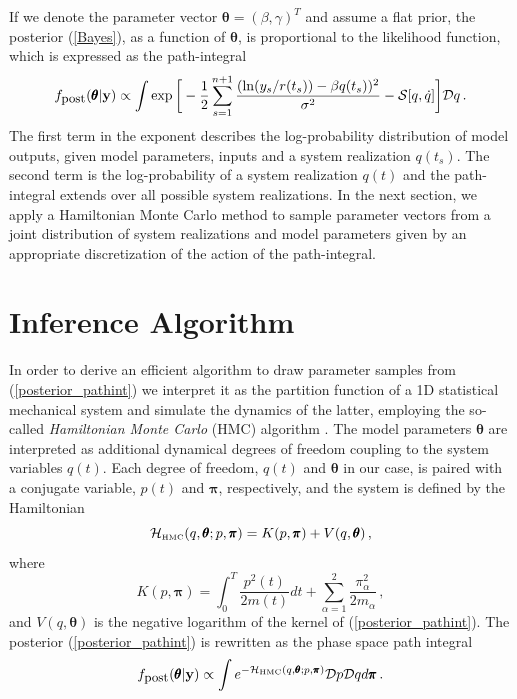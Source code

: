 \documentclass[12pt,a4paper,final]{iopart}
\newcommand{\bt}{\pmb\theta}
\newcommand{\vc}[1]{{\bf #1 }}
\begin{document}
If we denote the parameter vector $\bt=(\beta,\gamma)^T$ and assume a flat prior, the posterior (\ref{Bayes}), as a function of $\bt$, is proportional to the likelihood function, which is expressed as the path-integral
\begin{equation}\label{posterior_pathint}
  f_{\mbox{\small post}}(\bt | \vc y)
  \propto
  \int
  \exp\bigg[
    -\frac{1}{2}
    \sum_{s=1}^{n+1}
    \frac
    {(\ln(y_s/r(t_s))-{\beta q(t_s)})^2}
    {\sigma^2} -{{\mathcal S}}[{q},\dot q]
  \bigg]
  {\mathcal Dq}
  \,.
\end{equation}
The first term in the exponent describes the log-probability distribution of model outputs, given model parameters, inputs and a system realization $q(t_s)$. The second term is the log-probability of a system realization $q(t)$ and the path-integral extends over all possible system realizations. In the next section, we apply a Hamiltonian Monte Carlo method to sample parameter vectors from a joint distribution of system realizations and model parameters given by an appropriate discretization of the action of the path-integral.



\section{Inference Algorithm}

In order to derive an efficient algorithm to draw parameter samples from (\ref{posterior_pathint}) we interpret it as the partition function of a 1D statistical mechanical system and simulate the dynamics of the latter, employing the so-called {\em Hamiltonian Monte Carlo} (HMC) algorithm \cite{duane_1987}.
The model parameters $\bt$ are interpreted as additional dynamical degrees of freedom coupling to the system variables $q(t)$.
Each degree of freedom, $q(t)$ and $\bt$ in our case, is paired with a conjugate variable, $p(t)$ and ${\pmb\pi}$, respectively, and the system is defined by the  Hamiltonian
\begin{equation}\label{Hamiltonian}
    \mathcal{H}_{\mbox{\tiny HMC}}(q,\bt; p,{\pmb\pi})
    =
    K( p,{\pmb\pi}) + V( q,\bt)\,,
\end{equation}
where
\begin{equation}\label{K}
   K( p,{\pmb\pi})
   =
   \int_0^T \frac{ p^2(t)}{2m(t)}dt
   + \sum_{\alpha=1}^2\frac{\pi_\alpha^2}{2m_\alpha}\,,
\end{equation}
and $V( q,\bt)$ is the negative logarithm of the kernel of (\ref{posterior_pathint}).
The posterior (\ref{posterior_pathint}) is rewritten as the phase space path integral
\begin{equation}\label{phaseSpacePathInt}
    f_{\mbox{\small post}}(\bt | \vc y)
  \propto
  \int
  e^{-\mathcal {H}_{\mbox{\tiny HMC}}(q,\bt; p,{\pmb\pi})}
  {\mathcal Dp}
   {\mathcal Dq}
   d{\pmb\pi}
  \,.
\end{equation}
\end{document}
